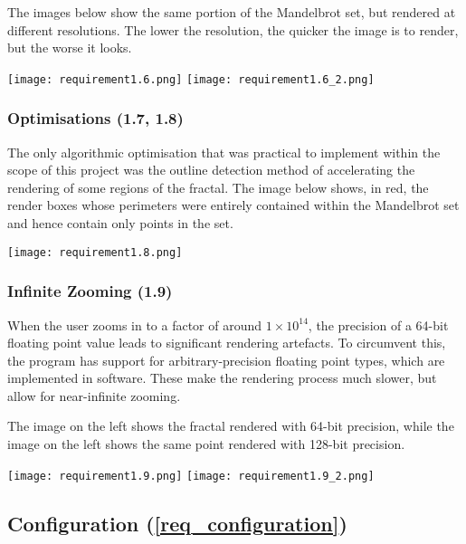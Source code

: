The images below show the same portion of the Mandelbrot set, but rendered at different resolutions. The lower the resolution, the quicker the image is to render, but the worse it looks.

\FloatBarrier
\begin{figure*}[htp]
	\centering
	\texttt{[image: requirement1.6.png]}
	\texttt{[image: requirement1.6\_2.png]}
\end{figure*}
\FloatBarrier

\subsubsection{Optimisations (1.7, 1.8)}

The only algorithmic optimisation that was practical to implement within the scope of this project was the outline detection method of accelerating the rendering of some regions of the fractal. The image below shows, in red, the render boxes whose perimeters were entirely contained within the Mandelbrot set and hence contain only points in the set.

\FloatBarrier
\begin{figure*}[htp]
	\centering
	\texttt{[image: requirement1.8.png]}
\end{figure*}
\FloatBarrier

\subsubsection{Infinite Zooming (1.9)}

When the user zooms in to a factor of around $1 \times 10 ^{14}$, the precision of a 64-bit floating point value leads to significant rendering artefacts. To circumvent this, the program has support for arbitrary-precision floating point types, which are implemented in software. These make the rendering process much slower, but allow for near-infinite zooming.

The image on the left shows the fractal rendered with 64-bit precision, while the image on the left shows the same point rendered with 128-bit precision.

\FloatBarrier
\begin{figure*}[htp]
	\centering
	\texttt{[image: requirement1.9.png]}
	\texttt{[image: requirement1.9\_2.png]}
\end{figure*}
\FloatBarrier


\subsection{Configuration (\ref{req_configuration})}

